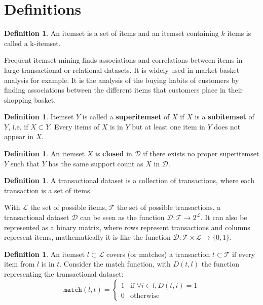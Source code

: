 \documentclass[12pt, openany]{report}
\theoremstyle{definition}
\newtheorem{definition}[thm]{Definition}
\begin{document}
\section{Definitions}
\begin{definition}
    An itemset is a set of items and an itemset containing $k$ items is called a k-itemset.
\end{definition}
Frequent itemset mining finds associations and correlations between items in large transactional or relational datasets. It is widely used in market basket analysis for example. It is the analysis of the buying habits of customers by finding associations between the different items that customers place in their shopping basket.
\begin{definition}
    Itemset $Y$ is called a \textbf{superitemset} of $X$ if $X$ is a \textbf{subitemset} of $Y$, i.e. if $X \subset Y$. Every items of $X$ is in $Y$ but at least one item in $Y$ does not appear in $X$.
\end{definition}
\begin{definition}
    An itemset $X$ is \textbf{closed} in $\mathcal{D}$ if there exists no proper superitemset $Y$ such that $Y$ has the same support count as $X$ in $\mathcal{D}$.
\end{definition}
\begin{definition}
    A transactional dataset is a collection of transactions, where each transaction is a set of items.
\end{definition}
With $\mathcal{L}$ the set of  possible items, $\mathcal{T}$ the set of possible transactions, a transactional dataset $\mathcal{D}$ can be seen as the function $\mathcal{D}:\mathcal{T} \rightarrow 2^{\mathcal{L}}$. It can also be represented as a binary matrix, where rows represent transactions and columns represent items, mathematically it is like the function $\mathcal{D}:\mathcal{T} \times \mathcal{L} \rightarrow \{0,1\}$. 
\begin{definition}
    An itemset $l \subset \mathcal{L}$ covers (or matches) a transaction $t \subset \mathcal{T}$ if every item from $l$ is in $t$. Consider the match function, with $D(t,l)$ the function representing the transactional dataset:
    \begin{equation}
        \texttt{match}(l,t) = \begin{cases}
        1 & \text{if } \forall i \in l, D(t,i) = 1 \\
        0 & \text{otherwise}
        \end{cases}
    \end{equation}
\end{definition}
\end{document}
